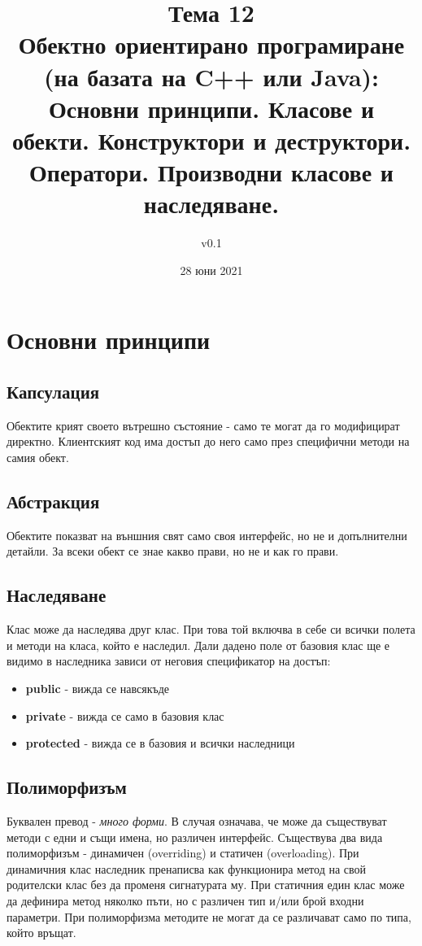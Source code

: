 \documentclass[fleqn,12pt]{article}
\title{Тема 12\\Обектно ориентирано програмиране (на базата на C++ или Java): Основни
принципи. Класове и обекти. Конструктори и деструктори. Оператори.
Производни класове и наследяване.}
\author{v0.1}
\date{28 юни 2021}
\begin{document}
\maketitle

\tableofcontents

\section{Основни принципи}
\subsection{Капсулация}
Обектите крият своето вътрешно състояние - само те могат да го модифицират директно. 
Клиентският код има достъп до него само през специфични методи на самия обект.

\subsection{Абстракция}
Обектите показват на външния свят само своя интерфейс, но не и допълнителни детайли. 
За всеки обект се знае какво прави, но не и как го прави.

\subsection{Наследяване}
Клас може да наследява друг клас. При това той включва в себе си всички полета и методи на класа, който е наследил.
Дали дадено поле от базовия клас ще е видимо в наследника зависи от неговия спецификатор на достъп:
\begin{itemize}
    \item \textbf{public} - вижда се навсякъде
    \item \textbf{private} - вижда се само в базовия клас
    \item \textbf{protected} - вижда се в базовия и всички наследници
\end{itemize}

\subsection{Полиморфизъм}
Буквален превод - \textit{много форми}.
В случая означава, че може да съществуват методи с едни и същи имена, но различен интерфейс.
Съществува два вида полиморфизъм - динамичен (overriding) и статичен (overloading).
При динамичния клас наследник пренаписва как функционира метод на свой родителски клас без да променя сигнатурата му.
При статичния един клас може да дефинира метод няколко пъти, но с различен тип и/или брой входни параметри.
При полиморфизма методите не могат да се различават само по типа, който връщат.
\end{document}
